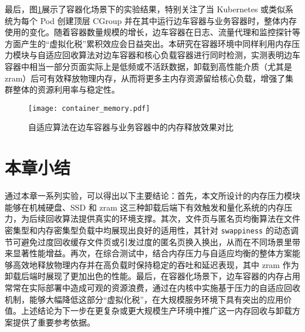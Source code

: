 最后，图\ref{fig:container_memory}展示了容器化场景下的实验结果，特别关注了当 Kubernetes 或类似系统为每个 Pod 创建顶层 CGroup 并在其中运行边车容器与业务容器时，整体内存使用的变化。随着容器数量规模的增长，边车容器在日志、流量代理和监控探针等方面产生的“虚拟化税”累积效应会日益突出。本研究在容器环境中同样利用内存压力模块与自适应回收算法对边车容器和核心负载容器进行同时检测，实测表明边车容器中相当一部分页面实际上是低频或不活跃数据，卸载到高性能介质（尤其是 zram）后可有效释放物理内存，从而将更多主内存资源留给核心负载，增强了集群整体的资源利用率与稳定性。

\begin{figure}[htbp]
    \centering
    \texttt{[image: container\_memory.pdf]}
    \caption{自适应算法在边车容器与业务容器中的内存释放效果对比}
    \label{fig:container_memory}
\end{figure}

\section{本章小结}

通过本章一系列实验，可以得出以下主要结论：首先，本文所设计的内存压力模块能够在机械硬盘、SSD 和 zram 这三种卸载后端下有效触发和量化系统的内存压力，为后续回收算法提供真实的环境支撑。其次，文件页与匿名页均衡算法在文件密集型和内存密集型负载中均展现出良好的适用性，其针对 \texttt{swappiness} 的动态调节可避免过度回收缓存文件页或引发过度的匿名页换入换出，从而在不同场景里带来显著性能增益。再次，在综合测试中，结合内存压力与自适应均衡的整体方案能够高效地释放物理内存并在高负载时保持稳定的吞吐和延迟表现，其中 zram 作为卸载后端时展现了更加出色的性能。最后，在容器化场景下，边车容器的内存占用常常在实际部署中造成可观的资源浪费，通过在内核中实施基于压力的自适应回收机制，能够大幅降低这部分“虚拟化税”，在大规模服务环境下具有突出的应用价值。上述结论为下一步在更复杂或更大规模生产环境中推广这一内存回收与卸载方案提供了重要参考依据。
